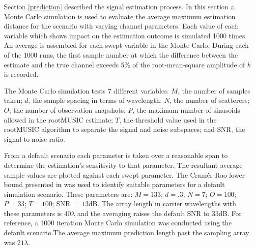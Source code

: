 \documentclass{allertonproc}
\begin{document}
Section \ref{prediction} described the signal estimation process. In this section a Monte Carlo simulation is used to evaluate the average maximum estimation distance for the scenario with varying channel parameters. Each value of each variable which shows impact on the estimation outcome is simulated 1000 times. An average is assembled for each swept variable in the Monte Carlo. During each of the 1000 runs, the first sample number at which the difference between the estimate and the true channel exceeds 5\% of the root-mean-square amplitude of $h$ is recorded.

The Monte Carlo simulation tests 7 different variables: $M$, the number of samples taken; $d$, the sample spacing in terms of wavelength; $N$, the number of scatterers; $O$, the number of observation snapshots; $P$, the maximum number of sinusoids allowed in the rootMUSIC estimate; $T$, the threshold value used in the rootMUSIC algorithm to separate the signal and noise subspaces; and SNR, the signal-to-noise ratio.

From a default scenario each parameter is taken over a reasonable span to determine the estimation's sensitivity to that parameter. The resultant average sample values are plotted against each swept parameter. The Cram\'er-Rao lower bound presented in \cite{kckpVTC2015} was used to identify suitable parameters for a default simulation scenario. These parameters are: $M = 133$; $d = .3$; $N = 7$; $O = 100$; $P = 33$; $T = 100$; SNR $= 13$dB. The array length in carrier wavelengths with these parameters is $40\lambda$ and the averaging raises the default SNR to $33$dB. For reference, a 1000 iteration Monte Carlo simulation was conducted using the default scenario.The average maximum prediction length past the sampling array was $21\lambda$.

\end{document}
